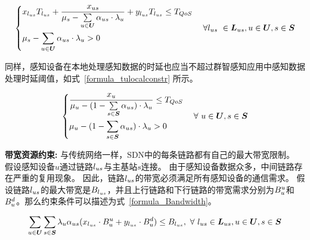 \begin{equation}
\label{formula_tscloudconstr}
  \left\{
    \begin{aligned}
    &x_{l_{us}} T_{l_{us}} + \frac{{x}_{us}}{{\mu}_{s}-\sum\limits_{u \in \boldsymbol{U}}{\alpha}_{us} \cdot {\lambda}_{u}} + y_{l_{us}} T_{l_{us}} \leq T_{QoS}\\
    &{\mu}_{s}-\sum\limits_{u \in \boldsymbol{U}}{\alpha}_{us} \cdot {\lambda}_{u} > 0
    \end{aligned}
  \right.
  \quad \forall l_{us} \  \in \boldsymbol{L}_{us}, u\in \boldsymbol{U}, s \in \boldsymbol{S}
\end{equation}

同样，感知设备在本地处理感知数据的时延也应当不超过群智感知应用中感知数据处理时延阈值，如式~\eqref{formula_tulocalconstr} 所示。

\begin{equation}
\label{formula_tulocalconstr}
  \left\{
    \begin{aligned}
    &\frac{{x}_{u}}{{\mu}_{u} - (1 - \sum\limits_{s \in \boldsymbol{S}} {\alpha}_{us}) \cdot {\lambda}_{u}} \leq T_{QoS}\\
    &{\mu}_{u} - (1 - \sum\limits_{s \in \boldsymbol{S}}{\alpha}_{us}) \cdot {\lambda}_{u} > 0
    \end{aligned}
  \right.
  \quad \forall \ u\in \boldsymbol{U}, s\in \boldsymbol{S}
\end{equation}

\textbf{带宽资源约束:}
与传统网络一样，SDN中的每条链路都有自己的最大带宽限制。
假设感知设备$u$通过链路$l_{us}$与主基站$s$连接。
由于感知设备数据众多，中间链路存在严重的复用现象。
因此，链路$l_{us}$的带宽必须满足所有感知设备的通信需求。
假设链路$l_{us}$的最大带宽是$B_{l_{us}}$，并且上行链路和下行链路的带宽需求分别为$B^{u}_u$和$B^{d}_u$。那么约束条件可以描述为式~\eqref{formula_Bandwidth}。

\begin{equation}
\label{formula_Bandwidth}
\begin{gathered}
\sum\limits_{u \in \boldsymbol{U}} \sum\limits_{s\in \boldsymbol{S}}\lambdau\aus(\xlus \cdot \Bu + \ylus \cdot \Bd) \leq \Blus, \ 
\forall \ \lus\in \Lus, u\in \boldsymbol{U}, s\in \boldsymbol{S}\\
\end{gathered}
\end{equation}

